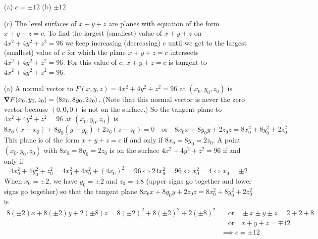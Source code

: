 %

\begin{answer}
(a) $c=\pm 12$ \qquad
(b) $\pm 12$

(c) The level surfaces of $x+y+z$ are planes with equation of the
form $x+y+z=c$. To find the largest (smallest) value of 
$x+y+z$ on $4x^2+4y^2+z^2=96$ we keep increasing (decreasing) $c$ until
we get to the largest (smallest) value of $c$ for which the plane 
$x+y+z=c$ intersects $4x^2+4y^2+z^2=96$. For this value of $c$, 
$x+y+z=c$ is tangent to $4x^2+4y^2+z^2=96$.
\end{answer}

\begin{solution}
(a) A normal vector to $F(x,y,z)=4x^2+4y^2+z^2=96$ at 
$(x_0,y_0,z_0)$ is $\vnabla F(x_0,y_0,z_0)=\llt 8x_0,8y_0,2z_0\rgt$. 
(Note that this normal vector is never the zero vector because $(0,0,0)$
is not on the surface.) So the tangent plane
to $4x^2+4y^2+z^2=96$ at $(x_0,y_0,z_0)$ is
\begin{equation*}
8x_0(x-x_0)+8y_0(y-y_0)+2z_0(z-z_0)=0\quad\text{or}\quad
8x_0x+8y_0y+2z_0z=8x_0^2+8y_0^2+2z_0^2
\end{equation*}
This plane is of the form $x+y+z=c$ if and only if $8x_0=8y_0=2z_0$.
A point $(x_0,y_0,z_0)$ with $8x_0=8y_0=2z_0$ is on the surface 
$4x^2+4y^2+z^2=96$ if and only if
\begin{equation*}
4x_0^2+4y_0^2+z_0^2=4x_0^2+4x_0^2+(4x_0)^2=96
\iff 24 x_0^2=96
\iff x_0^2=4
\iff x_0=\pm 2
\end{equation*}
When $x_0=\pm 2$, we have $y_0=\pm 2$ and $z_0=\pm 8$ (upper signs go together
and lower signs go together) so that the tangent plane $8x_0x+8y_0y+2z_0z=8x_0^2+8y_0^2+2z_0^2$
is
\begin{align*}
8(\pm 2)x+8(\pm 2)y+2(\pm 8)z=8(\pm 2)^2+8(\pm 2)^2+2(\pm 8)^2
&\quad\text{or}\quad
\pm x \pm y \pm z=2+2+8\\
&\quad\text{or}\quad
 x + y + z=\mp 12\\
&\implies  c=\pm 12
\end{align*}


\end{solution}
